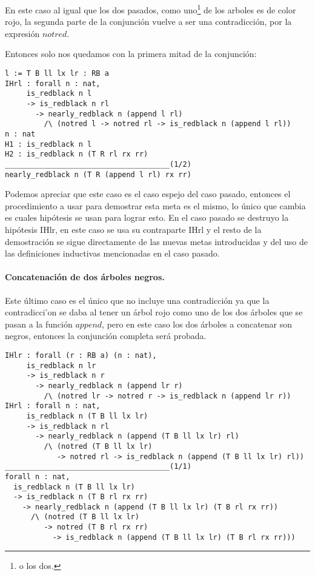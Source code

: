 En este caso al igual que los dos pasados, como uno\footnote{o los dos.} de los arboles es de
color rojo, la segunda parte de la conjunci\'on vuelve a ser una contradicci\'on, por la expresión
$notred$.

Entonces solo nos quedamos con la primera mitad de la conjunci\'on:

\begin{verbatim}
l := T B ll lx lr : RB a
IHrl : forall n : nat,
     is_redblack n l
     -> is_redblack n rl
       -> nearly_redblack n (append l rl)
         /\ (notred l -> notred rl -> is_redblack n (append l rl))
n : nat
H1 : is_redblack n l
H2 : is_redblack n (T R rl rx rr)
______________________________________(1/2)
nearly_redblack n (T R (append l rl) rx rr)
\end{verbatim}

Podemos apreciar que este caso es el caso espejo del caso pasado, entonces el procedimiento a usar
para demostrar esta meta es el mismo, lo \'unico que cambia es cuales hip\'otesis se usan para
lograr esto. En el caso pasado se destruyo la hip\'otesis IHlr, en este caso se usa su contraparte
IHrl y el resto de la demostraci\'on se sigue directamente de las nuevas metas introducidas y del
uso de las definiciones inductivas mencionadas en el caso pasado.

\paragraph{Concatenaci\'on de dos \'arboles negros.}

Este \'ultimo caso es el \'unico que no incluye una contradicci\'on ya que la contradicci'on se
daba al tener un \'arbol rojo como uno de los dos \'arboles que se pasan a la funci\'on $append$,
pero en este caso los dos \'arboles a concatenar son negros, entonces la conjunci\'on completa
ser\'a probada.

\begin{verbatim}
IHlr : forall (r : RB a) (n : nat),
     is_redblack n lr
     -> is_redblack n r
       -> nearly_redblack n (append lr r)
         /\ (notred lr -> notred r -> is_redblack n (append lr r))
IHrl : forall n : nat,
     is_redblack n (T B ll lx lr)
     -> is_redblack n rl
       -> nearly_redblack n (append (T B ll lx lr) rl)
         /\ (notred (T B ll lx lr)
            -> notred rl -> is_redblack n (append (T B ll lx lr) rl))
______________________________________(1/1)
forall n : nat,
  is_redblack n (T B ll lx lr)
  -> is_redblack n (T B rl rx rr)
    -> nearly_redblack n (append (T B ll lx lr) (T B rl rx rr))
      /\ (notred (T B ll lx lr)
         -> notred (T B rl rx rr)
           -> is_redblack n (append (T B ll lx lr) (T B rl rx rr)))
\end{verbatim}

